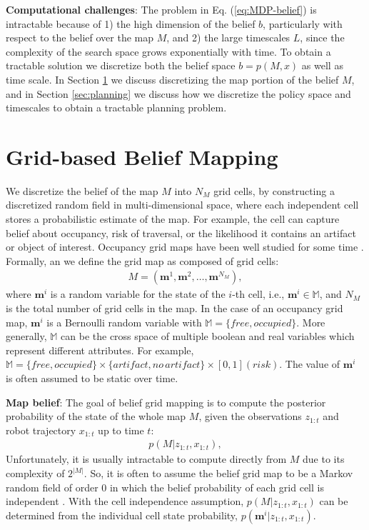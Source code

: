 \documentclass{article}
\newcommand{\ph}[1]{{\textbf{#1}:}} %
\begin{document}
\ph{Computational challenges}
The problem in Eq. (\ref{eq:MDP-belief}) is intractable because of 1) the high dimension of the belief $b$, particularly with respect to the belief over the map $M$, and 2) the large timescales $L$, since the complexity of the search space grows exponentially with time.  To obtain a tractable solution we discretize both the belief space $b=p(M,x)$ as well as time scale.  In Section \ref{sec:lattice_representation} we discuss discretizing the map portion of the belief $M$, and in Section \ref{sec:planning} we discuss how we discretize the policy space and timescales to obtain a tractable planning problem.




\section{Grid-based Belief Mapping} \label{sec:lattice_representation}

We discretize the belief of the map $M$ into $N_M$ grid cells, by constructing a discretized random field in multi-dimensional space, where each independent cell stores a probabilistic estimate of the map.  For example, the cell can capture belief about occupancy, risk of traversal, or the likelihood it contains an artifact or object of interest.  Occupancy grid maps have been well studied for some time \cite{moravec1985high,elfes1990stochastic}.
%
Formally, an we define the grid map as composed of grid cells:
\begin{align}
  M = (\mathbf{m}^1, \mathbf{m}^2, \dots, \mathbf{m}^{N_M}),
\end{align}
where $\mathbf{m}^i$ is a random variable for the state of the $i$-th cell,
i.e., $\mathbf{m}^i \in \mathbb{M}$, and
$N_M$ is the total number of grid cells in the map.
In the case of an occupancy grid map, $\mathbf{m}^i$ is a Bernoulli random variable with $\mathbb{M} = \{free, occupied\}$.  More generally, $\mathbb{M}$ can be the cross space of multiple boolean and real variables which represent different attributes.  For example, $\mathbb{M} = \{free, occupied\}\times\{artifact, no\, artifact\}\times [0,1] (risk)$.
The value of $\mathbf{m}^i$ is often assumed to be static over time.

\ph{Map belief} The goal of belief grid mapping is to compute the posterior probability of the state of the whole map $M$, given the observations $z_{1:t}$ and robot trajectory $x_{1:t}$ up to time $t$:
\begin{align}
  p(M | z_{1:t}, x_{1:t}),
\end{align}
Unfortunately, it is usually intractable to compute directly from $M$ due to its complexity of $2^{|M|}$.
So, it is often to assume the belief grid map to be a Markov random field of order 0 in which the belief probability of each grid cell is independent \cite{TBF05,elfes1990stochastic}.
With the cell independence assumption, $p(M | z_{1:t}, x_{1:t})$ can be determined from the individual cell state probability, $p(\mathbf{m}^i | z_{1:t}, x_{1:t})$.
\end{document}
